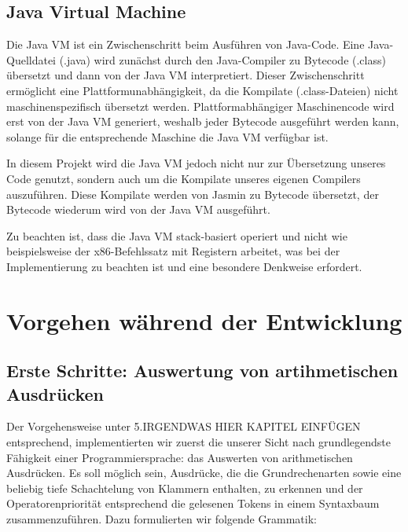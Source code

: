 \documentclass[12pt, a4paper, oneside, ngerman]{article}
\begin{document}
\subsection{Java Virtual Machine}
Die Java VM ist ein Zwischenschritt beim Ausführen von Java-Code. Eine Java-Quelldatei (.java) wird zunächst durch den Java-Compiler zu Bytecode (.class) übersetzt und dann von der Java VM interpretiert. Dieser Zwischenschritt ermöglicht eine Plattformunabhängigkeit, da die Kompilate (.class-Dateien) nicht maschinenspezifisch übersetzt werden. Plattformabhängiger Maschinencode wird erst von der Java VM generiert, weshalb jeder Bytecode ausgeführt werden kann, solange für die entsprechende Maschine die Java VM verfügbar ist.

In diesem Projekt wird die Java VM jedoch nicht nur zur Übersetzung unseres Code genutzt, sondern auch um die Kompilate unseres eigenen Compilers auszuführen. Diese Kompilate werden von Jasmin zu Bytecode übersetzt, der Bytecode wiederum wird von der Java VM ausgeführt.

Zu beachten ist, dass die Java VM stack-basiert operiert und nicht wie beispielsweise der x86-Befehlssatz mit Registern arbeitet, was bei der Implementierung zu beachten ist und eine besondere Denkweise erfordert. 

\pagebreak
\section{Vorgehen während der Entwicklung}
\subsection{Erste Schritte: Auswertung von artihmetischen Ausdrücken}
Der Vorgehensweise unter 5.IRGENDWAS HIER KAPITEL EINFÜGEN entsprechend, implementierten wir zuerst die unserer Sicht nach grundlegendste Fähigkeit einer Programmiersprache: das Auswerten von arithmetischen Ausdrücken. Es soll möglich sein, Ausdrücke, die die Grundrechenarten sowie eine beliebig tiefe Schachtelung von Klammern enthalten, zu erkennen und der Operatorenpriorität entsprechend die gelesenen Tokens in einem Syntaxbaum zusammenzuführen. Dazu formulierten wir folgende Grammatik:
\end{document}
